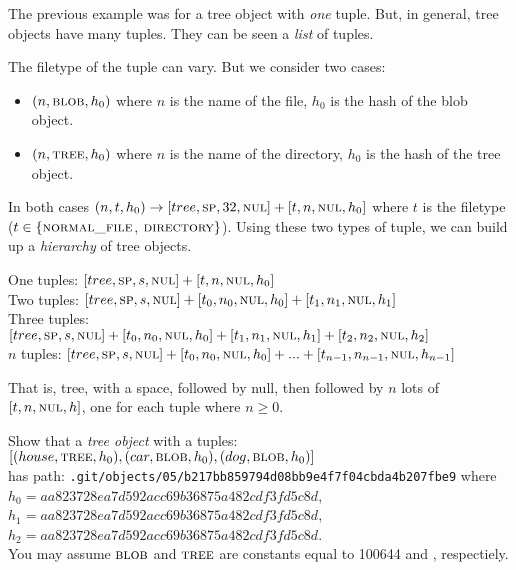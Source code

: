 The previous example was for a tree object with \textit{one} tuple.
But, in general, tree objects have many tuples. They can be seen a \textit{list} of tuples.


The filetype of the tuple can vary. But we consider two cases:
\begin{itemize}
\item
$(n,\textsc{blob},h_0)$  where $n$ 
is the name of the file, $h_0$ is the hash of the blob object.
\item
$(n,\textsc{tree},h_0)$ where $n$ 
is the name of the directory, $h_0$ is the hash of the tree object.
\end{itemize}

In both cases $(n,t,h_0) \rightarrow [tree,\textsc{sp},32,\textsc{nul}] + [t,n,\textsc{nul},h_0]$
where $t$ is the filetype ($t \in \{\textsc{normal\textunderscore file}$, $\textsc{directory}\}$). 
Using these two types of tuple, we can build up a \textit{hierarchy} of tree objects. 

One tuples: $[tree,\textsc{sp},s,\textsc{nul}] + [t,n,\textsc{nul},h_0]$\\
Two tuples: $[tree,\textsc{sp},s,\textsc{nul}] + [t_0,n_0,\textsc{nul},h_0] + [t_1,n_1,\textsc{nul},h_1]$\\
Three tuples: $[tree,\textsc{sp},s,\textsc{nul}] + [t_0,n_0,\textsc{nul},h_0] + [t_1,n_1,\textsc{nul},h_1] + [t_2,n_2,\textsc{nul},h_2]$\\
$n$ tuples: $[tree,\textsc{sp},s,\textsc{nul}] +  [t_0,n_0,\textsc{nul},h_0] + ... + [t_{n-1},n_{n-1},\textsc{nul},h_{n-1}]$

That is, tree, with a space, followed by null, 
then followed by $n$ lots of $[t,n,\textsc{nul},h]$, 
one for each tuple where $n \geqslant 0$. 

\frmrule 

\begin{example}
Show that a \textit{tree object} with a tuples:\\
$[(house,\textsc{tree},h_0),(car,\textsc{blob},h_0),(dog,\textsc{blob},h_0)]$\\
has path:
\lstinline{.git/objects/05/b217bb859794d08bb9e4f7f04cbda4b207fbe9}
where \\$h_0 = aa823728ea7d592acc69b36875a482cdf3fd5c8d$,\\
$h_1 = aa823728ea7d592acc69b36875a482cdf3fd5c8d$,\\
$h_2 = aa823728ea7d592acc69b36875a482cdf3fd5c8d$.\\
You may assume $\textsc{blob}$ and $\textsc{tree}$ are constants equal to 100644
and , respectiely.
\end{example}

